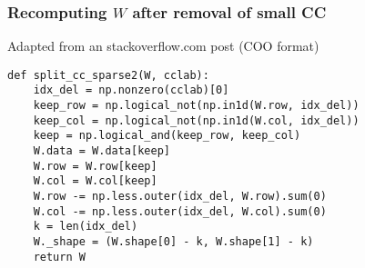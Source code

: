  \begin{frame}
  \frametitle{Recomputing $W$ after removal of small CC}
  \begin{block}{Adapted from an stackoverflow.com post (COO format)}
    \begin{lstlisting}
def split_cc_sparse2(W, cclab):
    idx_del = np.nonzero(cclab)[0]
    keep_row = np.logical_not(np.in1d(W.row, idx_del))
    keep_col = np.logical_not(np.in1d(W.col, idx_del))
    keep = np.logical_and(keep_row, keep_col)
    W.data = W.data[keep]
    W.row = W.row[keep]
    W.col = W.col[keep]
    W.row -= np.less.outer(idx_del, W.row).sum(0)
    W.col -= np.less.outer(idx_del, W.col).sum(0)
    k = len(idx_del)
    W._shape = (W.shape[0] - k, W.shape[1] - k)
    return W
    \end{lstlisting}
  \end{block}
\end{frame}
